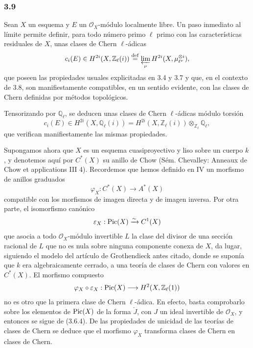 \subsubsection*{3.9}
Sean $X$ un esquema y $E$ un $\mathcal O_X$-módulo localmente libre. Un paso inmediato al límite permite definir, para todo número primo $\ell$ primo con las características residuales de $X$, unas clases de Chern $\ell$-ádicas
\[
c_i(E)\in H^{2i}(X,\mathbb Z_\ell(i))
\stackrel{\mathrm{def}}{=}\varprojlim_\nu H^{2i}(X,\mu_{\ell^\nu}^{\otimes i}),
\]
que poseen las propiedades usuales explicitadas en 3.4 y 3.7 y que, en el contexto de 3.8, son manifiestamente compatibles, en un sentido evidente, con las clases de Chern definidas por métodos topológicos.

Tensorizando por $\mathbb Q_\ell$, se deducen unas clases de Chern $\ell$-ádicas módulo torsión
\[
c_i(E)\in H^{2i}(X,\mathbb Q_\ell(i))
=H^{2i}(X,\mathbb Z_\ell(i))\otimes_{\mathbb Z_\ell}\mathbb Q_\ell,
\]
que verifican manifiestamente las mismas propiedades.

Supongamos ahora que $X$ es un esquema cuasiproyectivo y liso sobre un cuerpo $k$, y denotemos aquí por $C^*(X)$ su anillo de Chow (Sém. Chevalley: Anneaux de Chow et applications III 4). Recordemos que hemos definido en IV un morfismo de anillos graduados
\[
\varphi_X:C^*(X)\to A^*(X)
\]
compatible con los morfismos de imagen directa y de imagen inversa. Por otra parte, el isomorfismo canónico
\[
\varepsilon_X:\operatorname{Pic}(X)\xrightarrow{\sim} C^1(X)
\]
que asocia a todo $\mathcal O_X$-módulo invertible $L$ la clase del divisor de una sección racional de $L$ que no es nula sobre ninguna componente conexa de $X$, da lugar, siguiendo el modelo del artículo de Grothendieck antes citado, donde se suponía que $k$ era algebraicamente cerrado, a una teoría de clases de Chern con valores en $C^*(X)$. El morfismo compuesto
\[
\varphi_X\circ\varepsilon_X:\operatorname{Pic}(X)\longrightarrow H^2(X,\mathbb Z_\ell(1))
\]
no es otro que la primera clase de Chern $\ell$-ádica. En efecto, basta comprobarlo sobre los elementos de $\operatorname{Pic}(X)$ de la forma $\check J$, con $J$ un ideal invertible de $\mathcal O_X$, y entonces se sigue de (3.6.4). De las propiedades de unicidad de las teorías de clases de Chern se deduce que el morfismo $\varphi_X$ transforma clases de Chern en clases de Chern.

